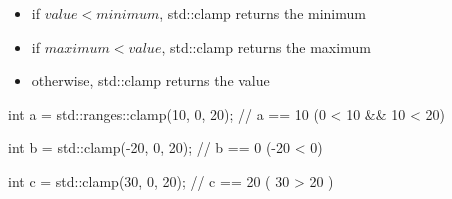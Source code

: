 \begin{itemize}
    \item if $value < minimum$, std::clamp returns the minimum
    \item if $maximum < value$, std::clamp returns the maximum
    \item otherwise, std::clamp returns the value
\end{itemize}

\begin{box-note}
\begin{cppcode}
int a = std::ranges::clamp(10, 0, 20);
// a == 10 (0 < 10 && 10 < 20)

int b = std::clamp(-20, 0, 20);
// b == 0 (-20 < 0)

int c = std::clamp(30, 0, 20);
// c == 20 ( 30 > 20 )
\end{cppcode}
\end{box-note}